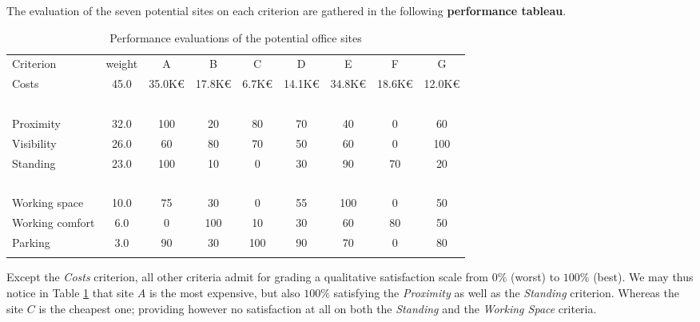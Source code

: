The evaluation of the seven potential sites on each criterion are gathered in the following \textbf{performance tableau}.

\begin{table}[h]
\caption{Performance evaluations of the potential office sites}
\label{tab:6.3}       %
\begin{center}
    \begin{tabular}{l|c|c|c|c|c|c|c|c}
      \hline\noalign{\smallskip}
    Criterion  &   weight &  A  &      B &       C &       D &       E &        F &        G\\
       \noalign{\smallskip}\hline\noalign{\smallskip}

    Costs     &    45.0  &   35.0K€ &  17.8K€  & 6.7K€  &  14.1K€ &  34.8K€ &  18.6K€ &  12.0K€\\
    \      &        \    &   \      &  \     &   \     &   \    &    \    &    \    &    \ \\
    Proximity     &     32.0  &   100    &  20 &      80    &   70    &   40    &   0    &    60 \\
    Visibility     &     26.0  &   60     &  80  &     70    &   50    &   60    &   0    &    100 \\
    Standing     &     23.0  &   100   &   10   &    0     &   30    &   90    &   70   &    20 \\
    \        &      \    &   \     &   \    &    \     &   \     &   \     &   \    &    \  \\
    Working space     &     10.0  &   75    &   30   &    0     &   55    &   100   &   0    &    50  \\
    Working comfort     &      6.0  &   0     &   100  &    10    &   30    &   60    &   80   &    50 \\
    Parking     &      3.0  &   90    &   30   &    100   &   90    &   70    &   0    &    80 \\
      \noalign{\smallskip}\hline
    \end{tabular}
  \end{center}
\end{table}

Except the \emph{Costs} criterion, all other criteria admit for grading a qualitative satisfaction scale from $0\%$ (worst) to $100\%$ (best). We may thus notice in Table \ref{tab:6.3} that site $A$ is the most expensive, but also $100\%$ satisfying the \emph{Proximity} as well as the  \emph{Standing} criterion. Whereas the site $C$ is the cheapest one; providing however no satisfaction at all on both the \emph{Standing} and the \emph{Working Space} criteria.

